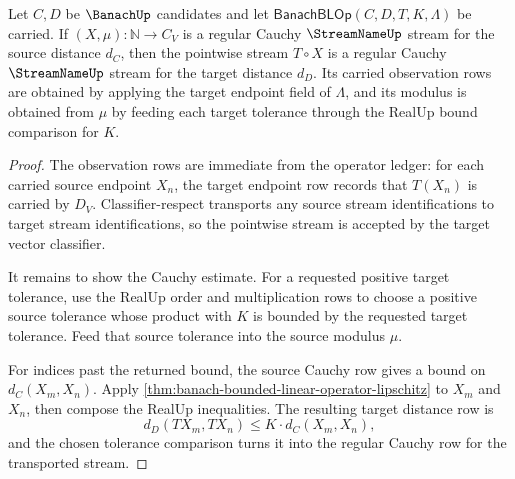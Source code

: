\begin{theorem}
\label{thm:banach-bounded-linear-operator-cauchy-transport}
Let $C,D$ be $\BanachUp$ candidates and let
$\mathsf{BanachBLOp}(C,D,T,K,\Lambda)$ be carried. If
$(X,\mu):\mathbb{N}\to C_V$ is a regular Cauchy $\StreamNameUp$ stream for the
source distance $d_C$, then the pointwise stream $T\circ X$ is a regular
Cauchy $\StreamNameUp$ stream for the target distance $d_D$. Its carried
observation rows are obtained by applying the target endpoint field of
$\Lambda$, and its modulus is obtained from $\mu$ by feeding each target
tolerance through the RealUp bound comparison for $K$.
\end{theorem}
\begin{proof}
The observation rows are immediate from the operator ledger: for each carried
source endpoint $X_n$, the target endpoint row records that $T(X_n)$ is
carried by $D_V$. Classifier-respect transports any source stream
identifications to target stream identifications, so the pointwise stream is
accepted by the target vector classifier.

It remains to show the Cauchy estimate. For a requested positive target
tolerance, use the RealUp order and multiplication rows to choose a positive
source tolerance whose product with $K$ is bounded by the requested target
tolerance. Feed that source tolerance into the source modulus $\mu$.

For indices past the returned bound, the source Cauchy row gives a bound on
$d_C(X_m,X_n)$. Apply
\autoref{thm:banach-bounded-linear-operator-lipschitz} to $X_m$ and $X_n$,
then compose the RealUp inequalities. The resulting target distance row is
$$
d_D(TX_m,TX_n)\le K\cdot d_C(X_m,X_n),
$$
and the chosen tolerance comparison turns it into the regular Cauchy row for
the transported stream.
\end{proof}

